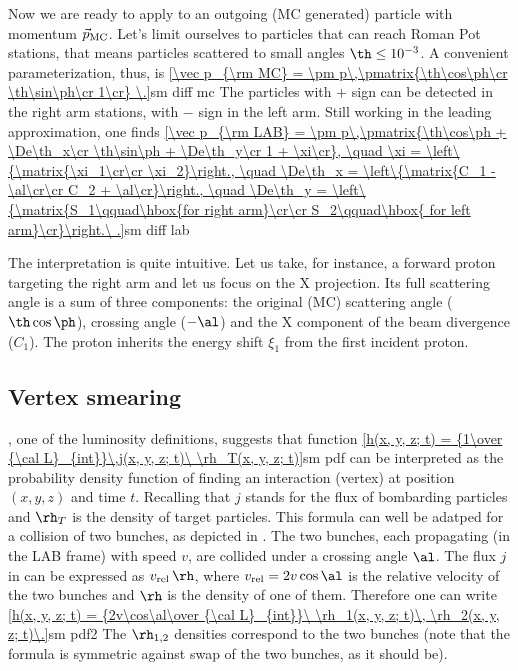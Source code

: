 Now we are ready to apply  to an outgoing (MC generated) particle with momentum $\vec p_{\rm MC}$. Let's limit ourselves to particles that can reach Roman Pot stations, that means particles scattered to small angles $\th \leq 10^{-3}$. A convenient parameterization, thus, is
\eqref{\vec p_{\rm MC} = \pm p\,\pmatrix{\th\cos\ph\cr \th\sin\ph\cr 1\cr} \.}{sm diff mc}
The particles with $+$ sign can be detected in the right arm stations, with $-$ sign in the left arm. Still working in the leading approximation, one finds
\eqref{\vec p_{\rm LAB} = \pm p\,\pmatrix{\th\cos\ph + \De\th_x\cr \th\sin\ph + \De\th_y\cr 1 + \xi\cr},
\quad \xi = \left\{\matrix{\xi_1\cr\cr \xi_2}\right.,
\quad \De\th_x = \left\{\matrix{C_1 - \al\cr\cr C_2 + \al\cr}\right.,
\quad \De\th_y = \left\{\matrix{S_1\qquad\hbox{for right arm}\cr\cr S_2\qquad\hbox{ for left arm}\cr}\right.\ .}{sm diff lab} %

The interpretation is quite intuitive. Let us take, for instance, a forward proton targeting the right arm and let us focus on the X projection. Its full scattering angle is a sum of three components: the original (MC) scattering angle ($\th\cos\ph$), crossing angle ($-\al$) and the X component of the beam divergence ($C_1$). The proton inherits the energy shift $\xi_1$ from the first incident proton.

\iffalse
Using the statistical properties suggested in the previous section yields the following relation between variances (recalling $\si_\th$ refers to the beam divergence)
\eqref{\si_{\De\th_x} = \si_{\De\th_y} = \si_{C_1} = \si_{C_2} = \si_{S_1} = \si_{S_2} = \cases{
{\si_\th\over\sqrt2}\qquad\hbox{for parameterization \Eq{mom par 1}}\cr
\si_\th\qquad\hbox{for parameterization \Eq{mom par 2}}\cr
}\ .}{delta th sigma}
\fi


\subsection{Vertex smearing}


, one of the luminosity definitions, suggests that function
\eqref{h(x, y, z; t) = {1\over {\cal L}_{int}}\,j(x, y, z; t)\ \rh_T(x, y, z; t)}{sm pdf}
can be interpreted as the probability density function of finding an interaction (vertex) at position $(x, y, z)$ and time $t$. Recalling that $j$ stands for the flux of bombarding particles and $\rh_T$ is the density of target particles. This formula can well be adatped for a collision of two bunches, as depicted in . The two bunches, each propagating (in the LAB frame) with speed $v$, are collided under a crossing angle $\al$. The flux $j$ in  can be expressed as $v_{\rm rel}\,\rh$, where $v_{\rm rel} = 2v\cos\al$ is the relative velocity of the two bunches and $\rh$ is the density of one of them. Therefore one can write
\eqref{h(x, y, z; t) = {2v\cos\al\over {\cal L}_{int}}\ \rh_1(x, y, z; t)\, \rh_2(x, y, z; t)\.}{sm pdf2}
The $\rh_{1,2}$ densities correspond to the two bunches (note that the formula is symmetric against swap of the two bunches, as it should be).

